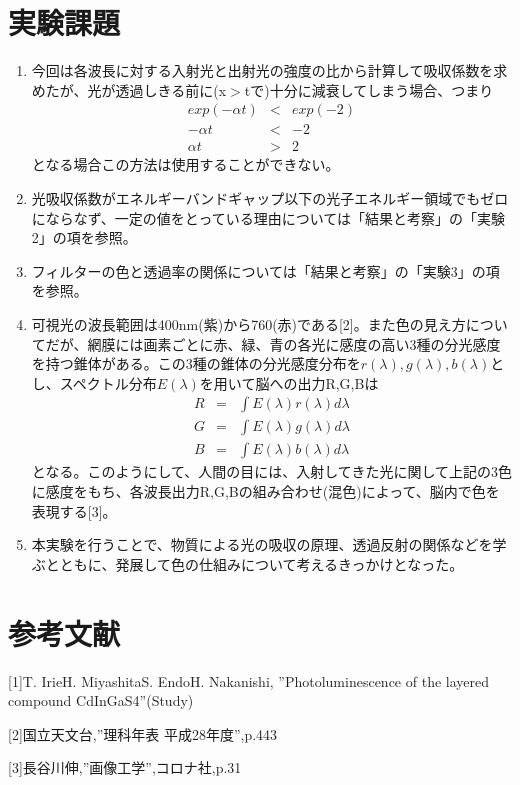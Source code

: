 \documentclass[11pt,a4j]{jsarticle}
\begin{document}
 \section{実験課題}
  \begin{enumerate}
  \item 今回は各波長に対する入射光と出射光の強度の比から計算して吸収係数を求めたが、光が透過しきる前に(x$>$tで)十分に減衰してしまう場合、つまり
  \begin{eqnarray}
  exp(-\alpha t) &<& exp(-2) \nonumber \\
  -\alpha t &<& -2 \nonumber \\
  \alpha t &>& 2 \nonumber 
  \end{eqnarray}
  となる場合この方法は使用することができない。
  \item 光吸収係数がエネルギーバンドギャップ以下の光子エネルギー領域でもゼロにならなず、一定の値をとっている理由については「結果と考察」の「実験2」の項を参照。
  \item フィルターの色と透過率の関係については「結果と考察」の「実験3」の項を参照。
  \item 可視光の波長範囲は400nm(紫)から760(赤)である[2]。また色の見え方についてだが、網膜には画素ごとに赤、緑、青の各光に感度の高い3種の分光感度を持つ錐体がある。この3種の錐体の分光感度分布を$r(\lambda),g(\lambda),b(\lambda)$とし、スペクトル分布$E(\lambda)$を用いて脳への出力R,G,Bは
  \begin{eqnarray}
  R &=& \int E(\lambda) r(\lambda) d\lambda \nonumber \\
  G &=& \int E(\lambda) g(\lambda) d\lambda \nonumber \\
  B &=& \int E(\lambda) b(\lambda) d\lambda \nonumber
  \end{eqnarray}
  となる。このようにして、人間の目には、入射してきた光に関して上記の3色に感度をもち、各波長出力R,G,Bの組み合わせ(混色)によって、脳内で色を表現する[3]。
  \item 本実験を行うことで、物質による光の吸収の原理、透過反射の関係などを学ぶとともに、発展して色の仕組みについて考えるきっかけとなった。
  \end{enumerate}
  
  
 \section{参考文献}
  [1]T. IrieH. MiyashitaS. EndoH. Nakanishi, ''Photoluminescence of the layered compound CdInGaS4''(Study) 
  
  [2]国立天文台,''理科年表 平成28年度'',p.443 
  
  [3]長谷川伸,''画像工学'',コロナ社,p.31 
  

  
\end{document}
